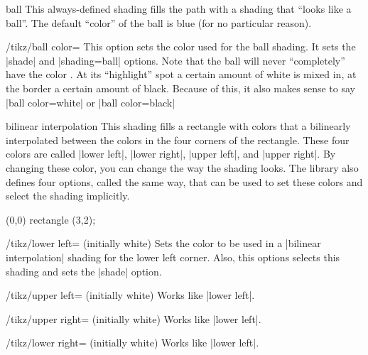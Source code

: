 \begin{shading}{ball}
    This always-defined shading fills the path with a shading that ``looks like
    a ball''. The default ``color'' of the ball is blue (for no particular
    reason).

    \begin{key}{/tikz/ball color=}
        This option sets the color used for the ball shading. It sets the
        |shade| and |shading=ball| options. Note that the ball will never
        ``completely'' have the color . At its ``highlight'' spot a
        certain amount of white is mixed in, at the border a certain amount of
        black. Because of this, it also makes sense to say |ball color=white|
        or |ball color=black|
\begin{codeexample}[preamble={\usepgflibrary{shadings}}]
\end{codeexample}
    \end{key}
\end{shading}

\begin{shading}{bilinear interpolation}
    This shading fills a rectangle with colors that a bilinearly interpolated
    between the colors in the four corners of the rectangle. These four colors
    are called |lower left|, |lower right|, |upper left|, and |upper right|. By
    changing these color, you can change the way the shading looks. The library
    also defines four options, called the same way, that can be used to set
    these colors and select the shading implicitly.
\begin{codeexample}[preamble={\usepgflibrary{shadings}}]
\tikz
  \shade[upper left=red,upper right=green,
         lower left=blue,lower right=yellow]
    (0,0) rectangle (3,2);
\end{codeexample}

    \begin{key}{/tikz/lower left= (initially white)}
        Sets the color to be used in a |bilinear interpolation| shading for the
        lower left corner. Also, this options selects this shading and sets the
        |shade| option.
    \end{key}

    \begin{key}{/tikz/upper left= (initially white)}
        Works like |lower left|.
    \end{key}

    \begin{key}{/tikz/upper right= (initially white)}
        Works like |lower left|.
    \end{key}

    \begin{key}{/tikz/lower right= (initially white)}
        Works like |lower left|.
    \end{key}
\end{shading}

